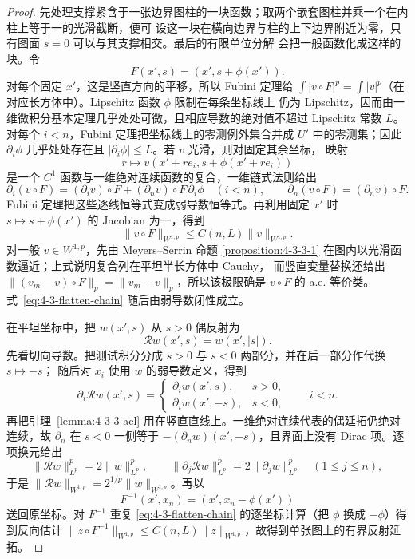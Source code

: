 \begin{proof}
先处理支撑紧含于一张边界图柱的一块函数；取两个嵌套图柱并乘一个在内柱上等于一的光滑截断，便可
设这一块在横向边界与柱的上下边界附近为零，只有图面 $s=0$ 可以与其支撑相交。最后的有限单位分解
会把一般函数化成这样的块。令
\[
 F(x',s)=(x',s+\phi(x')).
\]
对每个固定 $x'$，这是竖直方向的平移，所以 Fubini 定理给
$\int |v\circ F|^p=\int|v|^p$（在对应长方体中）。Lipschitz 函数 $\phi$ 限制在每条坐标线上
仍为 Lipschitz，因而由一维微积分基本定理几乎处处可微，且相应导数的绝对值不超过 Lipschitz
常数 $L$。
对每个 $i<n$，Fubini 定理把坐标线上的零测例外集合并成 $U'$ 中的零测集；因此
$\partial_i\phi$ 几乎处处存在且 $|\partial_i\phi|\leq L$。若 $v$ 光滑，则对固定其余坐标，
映射
\[
 r\longmapsto v(x'+re_i,s+\phi(x'+re_i))
\]
是一个 $C^1$ 函数与一维绝对连续函数的复合，一维链式法则给出
\[
 \partial_i(v\circ F)=(\partial_iv)\circ F
   +(\partial_nv)\circ F\,\partial_i\phi\quad(i<n),
 \qquad
 \partial_n(v\circ F)=(\partial_nv)\circ F.
 \tag{4.3.16}\label{eq:4-3-flatten-chain}
\]
Fubini 定理把这些逐线恒等式变成弱导数恒等式。再利用固定 $x'$ 时
$s\mapsto s+\phi(x')$ 的 Jacobian 为一，得到
\[
 \|v\circ F\|_{W^{1,p}}\leq C(n,L)\|v\|_{W^{1,p}}.
\]
对一般 $v\in W^{1,p}$，先由 Meyers--Serrin 命题
\ref{proposition:4-3-3-1} 在图内以光滑函数逼近；上式说明复合列在平坦半长方体中 Cauchy，
而竖直变量替换还给出
$\|(v_m-v)\circ F\|_p=\|v_m-v\|_p$，所以该极限确是 $v\circ F$ 的 a.e. 等价类。
式~\eqref{eq:4-3-flatten-chain} 随后由弱导数闭性成立。

在平坦坐标中，把 $w(x',s)$ 从 $s>0$ 偶反射为
\[
 \mathcal Rw(x',s)=w(x',|s|).
\]
先看切向导数。把测试积分分成 $s>0$ 与 $s<0$ 两部分，并在后一部分作代换 $s\mapsto-s$；
随后对 $x_i$ 使用 $w$ 的弱导数定义，得到
\[
 \partial_i\mathcal Rw(x',s)=
 \begin{cases}\partial_iw(x',s),&s>0,\\
                \partial_iw(x',-s),&s<0,
 \end{cases}
\qquad i<n.
\]
再把引理~\ref{lemma:4-3-3-acl} 用在竖直直线上。一维绝对连续代表的偶延拓仍绝对连续，故
$\partial_n$ 在 $s<0$ 一侧等于 $-(\partial_nw)(x',-s)$，且界面上没有 Dirac 项。逐项换元给出
\[
 \|\mathcal Rw\|_{L^p}^p=2\|w\|_{L^p}^p,\qquad
 \|\partial_j\mathcal Rw\|_{L^p}^p
 =2\|\partial_jw\|_{L^p}^p\quad(1\leq j\leq n),
\]
于是 $\|\mathcal Rw\|_{W^{1,p}}=2^{1/p}\|w\|_{W^{1,p}}$。再以
\[
 F^{-1}(x',x_n)=(x',x_n-\phi(x'))
\]
送回原坐标。对 $F^{-1}$ 重复 \eqref{eq:4-3-flatten-chain} 的逐坐标计算（把
$\phi$ 换成 $-\phi$）得到反向估计
$\|z\circ F^{-1}\|_{W^{1,p}}\leq C(n,L)\|z\|_{W^{1,p}}$，故得到单张图上的有界反射延拓。


\end{proof}
